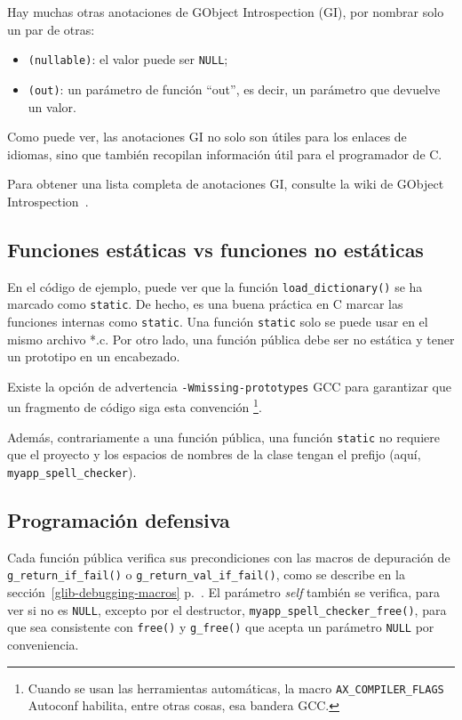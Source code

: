 Hay muchas otras anotaciones de GObject Introspection (GI), por nombrar solo un par de otras:
\begin{itemize}
    \item \texttt{(nullable)}: el valor puede ser \lstinline{NULL};
    \item \texttt{(out)}: un parámetro de función ``out'', es decir, un parámetro que devuelve un valor.
\end{itemize}

Como puede ver, las anotaciones GI no solo son útiles para los enlaces de idiomas, sino que también recopilan información útil para el programador de C.

Para obtener una lista completa de anotaciones GI, consulte la wiki de GObject Introspection~\cite{gobject-introspection}.

\subsection{Funciones estáticas vs funciones no estáticas}
En el código de ejemplo, puede ver que la función \lstinline{load_dictionary()} se ha marcado como \lstinline{static}. De hecho, es una buena práctica en C marcar las funciones internas como \lstinline{static}. Una función \lstinline{static} solo se puede usar en el mismo archivo *.c. Por otro lado, una función pública debe ser no estática y tener un prototipo en un encabezado.

Existe la opción de advertencia \texttt{-Wmissing-prototypes} GCC para garantizar que un fragmento de código siga esta convención \footnote{Cuando se usan las herramientas automáticas, la macro \texttt{AX\_COMPILER\_FLAGS} Autoconf habilita, entre otras cosas, esa bandera GCC.}.

Además, contrariamente a una función pública, una función \lstinline{static} no requiere que el proyecto y los espacios de nombres de la clase tengan el prefijo (aquí, \lstinline{myapp_spell_checker}).

\subsection{Programación defensiva}
Cada función pública verifica sus precondiciones con las macros de depuración de \lstinline{g_return_if_fail()} o \lstinline{g_return_val_if_fail()}, como se describe en la sección~\ref{glib-debugging-macros} p.~\pageref{glib-debugging-macros}. El parámetro \emph{self} también se verifica, para ver si no es \lstinline{NULL}, excepto por el destructor, \lstinline{myapp_spell_checker_free()}, para que sea consistente con \lstinline{free()} y \lstinline{g_free()} que acepta un parámetro \lstinline{NULL} por conveniencia.

